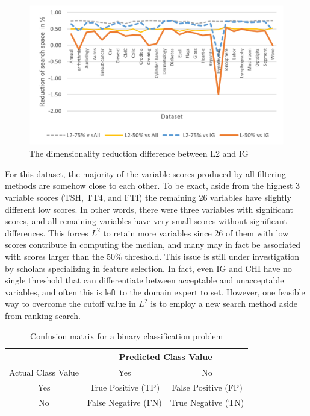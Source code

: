 \documentclass[review]{elsarticle}
\begin{document}
\begin{figure}[h]
	\centering
	\includegraphics[width=0.8\linewidth]{figs/fig_3a}
	\caption[fig 3c]{The dimensionality reduction difference between L2 and IG}
	\label{fig:fig3c}
\end{figure}


For this dataset, the majority of the variable scores produced by all filtering methods are somehow close to each other. To be exact, aside from the highest 3 variable scores (TSH, TT4, and FTI) the remaining 26 variables have slightly different low scores. In other words, there were three variables with significant scores, and all remaining variables have very small scores without significant differences. This forces $ L^2 $ to retain more variables since 26 of them with low scores contribute in computing the median, and many may in fact be associated with scores larger than the 50\% threshold.  This issue is still under investigation by scholars specializing in feature selection. In fact, even IG and CHI have no single threshold that can differentiate between acceptable and unacceptable variables, and often this is left to the domain expert to set. However, one feasible way to overcome the cutoff value in $ L^2 $ is to employ a new search method aside from ranking search.


\begin{table}[h]
	\centering
	\caption[short tbl2 table2]{Confusion matrix for a binary classification problem}
	\label{tab:confusion_matrix}
	\begin{tabular}{|c|c|c|}
		\hline 
		& \multicolumn{2}{c|}{ Predicted Class Value} \\ 
		\hline 
		Actual Class Value & Yes &  No \\ 
		\hline 
		Yes & True Positive (TP) & False Positive (FP) \\ 
		\hline 
		No & False Negative  (FN) & True Negative (TN) \\ 
		\hline
	\end{tabular} 
\end{table}
\end{document}
